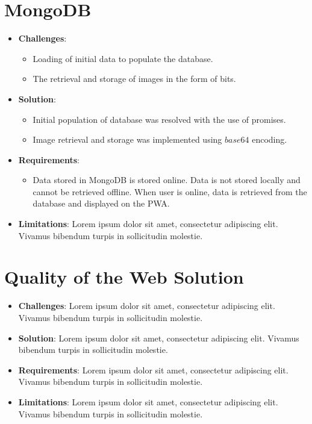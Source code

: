 \documentclass[11pt, a4paper]{article}
\begin{document}
\section{MongoDB}
\begin{itemize}
  \item \textbf{Challenges}:
  \begin{itemize}
    \item Loading of initial data to populate the database.
    \item The retrieval and storage of images in the form of bits.
  \end{itemize}
  \item \textbf{Solution}:
  \begin{itemize}
    \item Initial population of database was resolved with the use of promises.
    \item Image retrieval and storage was implemented using $base64$ encoding.
  \end{itemize}
  \item \textbf{Requirements}:
  \begin{itemize}
    \item Data stored in MongoDB is stored online. Data is not stored locally and cannot be
    retrieved offline. When user is online, data is retrieved from the database and displayed on the
    PWA.
  \end{itemize}
  \item \textbf{Limitations}: Lorem ipsum dolor sit amet, consectetur adipiscing elit. Vivamus
  bibendum turpis in sollicitudin molestie.
\end{itemize}

\section{Quality of the Web Solution}
\begin{itemize}
  \item \textbf{Challenges}: Lorem ipsum dolor sit amet, consectetur adipiscing elit. Vivamus
  bibendum turpis in sollicitudin molestie.
  \item \textbf{Solution}: Lorem ipsum dolor sit amet, consectetur adipiscing elit. Vivamus bibendum
  turpis in sollicitudin molestie.
  \item \textbf{Requirements}: Lorem ipsum dolor sit amet, consectetur adipiscing elit. Vivamus
  bibendum turpis in sollicitudin molestie.
  \item \textbf{Limitations}: Lorem ipsum dolor sit amet, consectetur adipiscing elit. Vivamus
  bibendum turpis in sollicitudin molestie.
\end{itemize}
\end{document}
